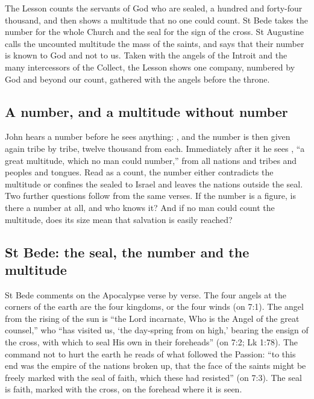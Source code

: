 
The Lesson counts the servants of God who are sealed, a hundred and forty-four
thousand, and then shows a multitude that no one could count. St Bede takes
the number for the whole Church and the seal for the sign of the cross. St
Augustine calls the uncounted multitude the mass of the saints, and says that
their number is known to God and not to us. Taken with the angels of the
Introit and the many intercessors of the Collect, the Lesson shows one company,
numbered by God and beyond our count, gathered with the angels before the
throne.

\subsection{A number, and a multitude without number}
\label{sec:sealed-question}

John hears a number before he sees anything: , and the number is
then given again tribe by tribe, twelve thousand from each. Immediately after
it he sees , ``a great
multitude, which no man could number,'' from all nations and tribes and
peoples and tongues. Read as a count, the number either contradicts the
multitude or confines the sealed to Israel and leaves the nations outside the
seal. Two further questions follow from the same verses. If the number is a
figure, is there a number at all, and who knows it? And if no man could count
the multitude, does its size mean that salvation is easily reached?

\subsection{St Bede: the seal, the number and the multitude}
\label{sec:sealed-bede}

St Bede comments on the Apocalypse verse by verse. The four angels at the
corners of the earth are the four kingdoms, or the four winds (on 7:1). The
angel from the rising of the sun is ``the Lord incarnate, Who is the Angel of
the great counsel,'' who ``has visited us, `the day-spring from on high,'
bearing the ensign of the cross, with which to seal His own in their
foreheads'' (on 7:2; Lk 1:78). The command not to hurt the earth he reads of
what followed the Passion: ``to this end was the empire of the nations broken
up, that the face of the saints might be freely marked with the seal of faith,
which these had resisted'' (on 7:3). The seal is faith, marked with the cross,
on the forehead where it is seen.

